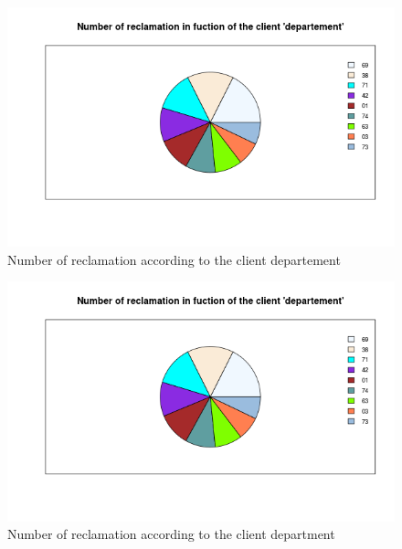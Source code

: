 \documentclass[a4paper, 11pt]{article}
\begin{document}
        \begin{figure}[!ht]
        	\centering
                \includegraphics[height = 10 cm]{Valentin/Number_of_reclamation_in_fuction_of_the_client_departement.png}
                \caption{Number of reclamation according to the client departement}
                \label{fig:reclamtion_dep1}
        \end{figure}
        
        \begin{figure}[!ht]
        	\centering
                \includegraphics[height = 10 cm]{Valentin/Number_of_reclamation_in_fuction_of_the_client_departement.png}
                \caption{Number of reclamation according to the client department}
                \label{fig:reclamtion_dep2}
        \end{figure}
        
\end{document}
